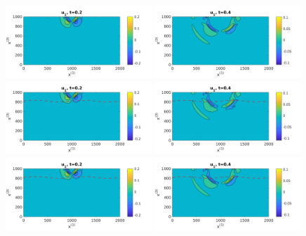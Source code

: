 \begin{figure}[htbp]
	\centering
	\includegraphics[width=0.49\textwidth,trim={0.05cm 0.1cm 0.55cm 0.45cm}, clip]{u1_t02_cartesian.png}
	\includegraphics[width=0.49\textwidth,trim={0.05cm 0.1cm 0.55cm 0.45cm}, clip]{u1_t04_cartesian.png}\\
	\includegraphics[width=0.49\textwidth,trim={0.05cm 0.1cm 0.55cm 0.45cm}, clip]{u1_t02_curvi_mr.png}
	\includegraphics[width=0.49\textwidth,trim={0.05cm 0.1cm 0.55cm 0.45cm}, clip]{u1_t04_curvi_mr.png}\\
	\includegraphics[width=0.49\textwidth,trim={0.05cm 0.1cm 0.55cm 0.45cm}, clip]{u1_t02_curvi_finer.png}
	\includegraphics[width=0.49\textwidth,trim={0.05cm 0.1cm 0.55cm 0.45cm}, clip]{u1_t04_curvi_finer.png}

\end{figure}
